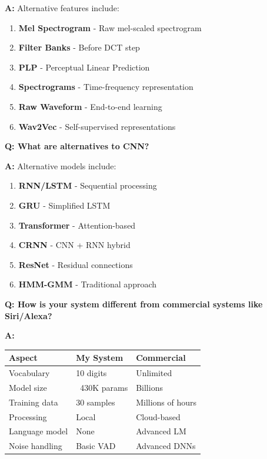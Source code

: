 \documentclass[a4paper,12pt]{article}
\newcommand{\vivaQ}[1]{\textcolor{questioncolor}{\textbf{Q: #1}}}
\newcommand{\vivaA}[1]{\textcolor{answercolor}{\textbf{A:}} #1}
\begin{document}
\vivaA{Alternative features include:
\begin{enumerate}
    \item \textbf{Mel Spectrogram} - Raw mel-scaled spectrogram
    \item \textbf{Filter Banks} - Before DCT step
    \item \textbf{PLP} - Perceptual Linear Prediction
    \item \textbf{Spectrograms} - Time-frequency representation
    \item \textbf{Raw Waveform} - End-to-end learning
    \item \textbf{Wav2Vec} - Self-supervised representations
\end{enumerate}}

\vspace{0.5cm}

\vivaQ{What are alternatives to CNN?}

\vivaA{Alternative models include:
\begin{enumerate}
    \item \textbf{RNN/LSTM} - Sequential processing
    \item \textbf{GRU} - Simplified LSTM
    \item \textbf{Transformer} - Attention-based
    \item \textbf{CRNN} - CNN + RNN hybrid
    \item \textbf{ResNet} - Residual connections
    \item \textbf{HMM-GMM} - Traditional approach
\end{enumerate}}

\vspace{0.5cm}

\vivaQ{How is your system different from commercial systems like Siri/Alexa?}

\vivaA{
\begin{tabular}{|l|l|l|}
\hline
\textbf{Aspect} & \textbf{My System} & \textbf{Commercial} \\
\hline
Vocabulary & 10 digits & Unlimited \\
\hline
Model size & ~430K params & Billions \\
\hline
Training data & 30 samples & Millions of hours \\
\hline
Processing & Local & Cloud-based \\
\hline
Language model & None & Advanced LM \\
\hline
Noise handling & Basic VAD & Advanced DNNs \\
\hline
\end{tabular}}
\end{document}
